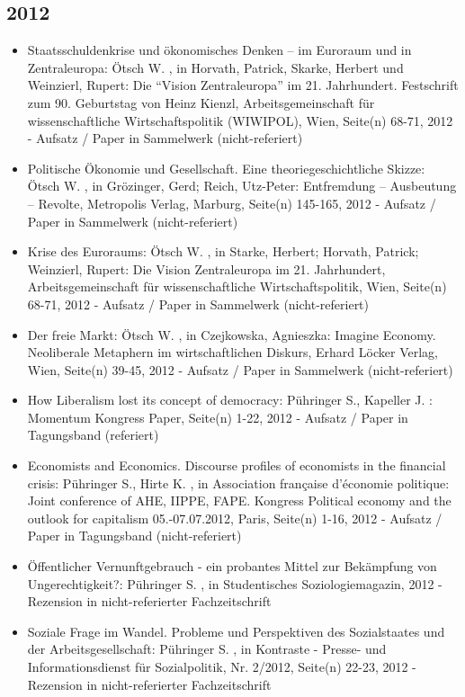 \subsection{2012} 
 \begin{itemize} 
	 \item Staatsschuldenkrise und ökonomisches Denken – im Euroraum und in Zentraleuropa: Ötsch W. , in Horvath, Patrick, Skarke, Herbert  und Weinzierl, Rupert: Die “Vision Zentraleuropa” im 21. Jahrhundert. Festschrift zum 90. Geburtstag von Heinz Kienzl, Arbeitsgemeinschaft für wissenschaftliche Wirtschaftspolitik (WIWIPOL), Wien, Seite(n) 68-71, 2012 - Aufsatz / Paper in Sammelwerk (nicht-referiert)
	 \item Politische Ökonomie und Gesellschaft. Eine theoriegeschichtliche Skizze: Ötsch W. , in Grözinger, Gerd; Reich, Utz-Peter: Entfremdung – Ausbeutung – Revolte, Metropolis Verlag, Marburg, Seite(n) 145-165, 2012 - Aufsatz / Paper in Sammelwerk (nicht-referiert)
	 \item Krise des Euroraums: Ötsch W. , in Starke, Herbert; Horvath, Patrick; Weinzierl, Rupert: Die Vision Zentraleuropa im 21. Jahrhundert, Arbeitsgemeinschaft für wissenschaftliche Wirtschaftspolitik, Wien, Seite(n) 68-71, 2012 - Aufsatz / Paper in Sammelwerk (nicht-referiert)
	 \item Der freie Markt: Ötsch W. , in Czejkowska, Agnieszka: Imagine Economy. Neoliberale Metaphern im wirtschaftlichen Diskurs, Erhard Löcker Verlag, Wien, Seite(n) 39-45, 2012 - Aufsatz / Paper in Sammelwerk (nicht-referiert)
	 \item How Liberalism lost its concept of democracy: Pühringer S., Kapeller J. : Momentum Kongress Paper, Seite(n) 1-22, 2012 - Aufsatz / Paper in Tagungsband (referiert)
	 \item Economists and Economics. Discourse profiles of economists in the financial crisis: Pühringer S., Hirte K. , in Association française d'économie politique: Joint conference of AHE, IIPPE, FAPE. Kongress Political economy and the outlook for capitalism 05.-07.07.2012, Paris, Seite(n) 1-16, 2012 - Aufsatz / Paper in Tagungsband (nicht-referiert)
	 \item Öffentlicher Vernunftgebrauch - ein probantes Mittel zur Bekämpfung von Ungerechtigkeit?: Pühringer S. , in Studentisches Soziologiemagazin, 2012 - Rezension in nicht-referierter Fachzeitschrift
	 \item Soziale Frage im Wandel. Probleme und Perspektiven des Sozialstaates und der Arbeitsgesellschaft: Pühringer S. , in Kontraste - Presse- und Informationsdienst für Sozialpolitik, Nr. 2/2012, Seite(n) 22-23, 2012 - Rezension in nicht-referierter Fachzeitschrift

\end{itemize}
